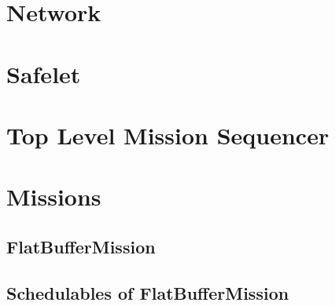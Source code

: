 \documentclass[10pt,a4paper]{article}
\begin{document}
\section{Network}

\newpage

\section{Safelet}

\newpage

\section{Top Level Mission Sequencer}

\newpage

\section{Missions}


\subsection{FlatBufferMission}

\newpage

\subsection{Schedulables of FlatBufferMission}


\newpage


\end{document}
